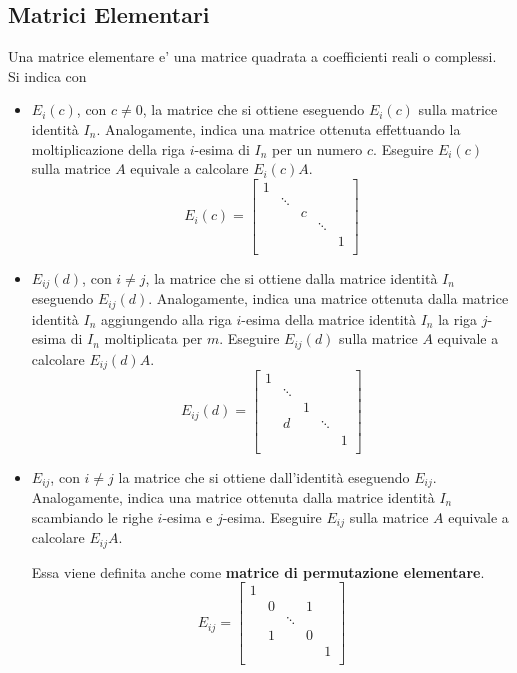 \documentclass[a4paper, 10pt]{article}
\begin{document}
	\subsection{Matrici Elementari}
	Una matrice elementare e' una matrice quadrata a coefficienti reali o complessi.
	Si indica con
	\begin{itemize}
		\item $E_{i}(c)$, con $c \neq 0$, la matrice che si ottiene eseguendo $E_{i}(c)$ sulla matrice identità $I_{n}$.
			  Analogamente, indica una matrice ottenuta effettuando la moltiplicazione della riga $i$-esima di $I_{n}$ 
			  per un numero $c$. 
		      Eseguire $E_{i}(c)$ sulla matrice $A$ equivale a calcolare $E_{i}(c)A$. 
		      \[
		      E_{i}(c) =
		      \begin{bmatrix}
		      	1  &  &  &  & \\
		      	   & \ddots  &  &  & \\
		      	   &  & c &  & \\
		      	   &  &  &  \ddots & \\
		      	   &  &  &  & 1 \\
		      \end{bmatrix}
		      \]
		\item $E_{ij}(d)$, con $i \neq j$, la matrice che si ottiene dalla matrice identità $I_{n}$ 
			  eseguendo $E_{ij}(d)$. 
			  Analogamente, indica una matrice ottenuta dalla matrice identità $I_{n}$ aggiungendo alla riga
			  $i$-esima della matrice identità $I_{n}$ la riga $j$-esima di $I_{n}$ moltiplicata per $m$.
			  Eseguire $E_{ij}(d)$ sulla matrice $A$ equivale a calcolare $E_{ij}(d)A$. 
			  \[
		      E_{ij}(d) =
		      \begin{bmatrix}
		      	1  &  &  &  & \\
		      	& \ddots  &  &  & \\
		      	&  &  1 &  & \\
		      	&  d  & & \ddots & \\
		      	&  &  &  & 1 \\
		      \end{bmatrix}
		      \]
		\newpage
		\item $E_{ij}$, con $i \neq j$ la matrice che si ottiene dall'identità eseguendo $E_{ij}$. 
			  Analogamente, indica una matrice ottenuta dalla matrice identità $I_{n}$ scambiando le righe $i$-esima 
			  e $j$-esima.
			  Eseguire $E_{ij}$ sulla matrice $A$ equivale a calcolare $E_{ij}A$.
			  
			  Essa viene definita anche come \textbf{matrice di permutazione elementare}.
			  \[
		      E_{ij} =
		      \begin{bmatrix}
		      	1  &  &  &  & \\
		      	& 0  &  & 1 & \\
		      	&  &  \ddots &  & \\
		      	&  1  & & 0 & \\
		      	&  &  &  & 1 \\
		      \end{bmatrix}
		      \]
	\end{itemize}
\end{document}
